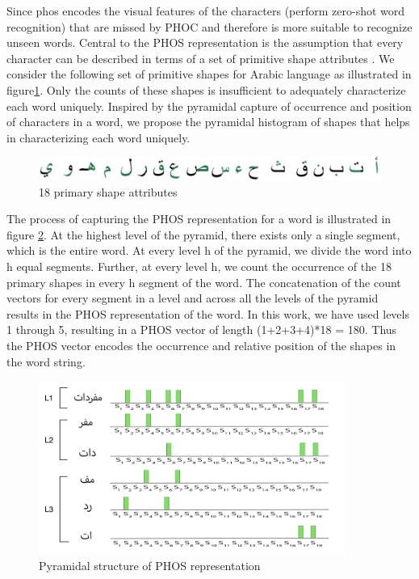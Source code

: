 Since \acrshort{phos} encodes the visual features of the characters (perform zero-shot word recognition) that are missed by PHOC and therefore is more suitable to recognize unseen words. Central to the PHOS representation is the assumption that every character can be described in terms of a set of primitive shape attributes \cite{ZEROSHOT}. We consider the following set of primitive shapes for Arabic language as illustrated in figure\ref{fig:arabic-primary-shape}. Only the counts of these shapes is insufficient to adequately characterize each word uniquely. Inspired by the pyramidal capture of occurrence and position of characters in a word, we propose the pyramidal histogram of shapes that helps in characterizing each word uniquely.

\begin{figure}[!htb]
    \centering
    \includegraphics[width=14cm]{images/arabic-letters.png}
    \caption{18 primary shape attributes}
    \label{fig:arabic-primary-shape}
\end{figure}


The process of capturing the PHOS representation for a word is illustrated in figure \ref{fig:phos-representation}. At the highest level of the pyramid, there exists only a single segment, which is the entire word. At every level h of the pyramid, we divide the word into h equal segments. Further, at every level h, we count the occurrence of the 18 primary shapes in every h segment of the word. The concatenation of the count vectors for every segment in a level and across all the levels of the pyramid results in the PHOS representation of the word. In this work, we have used levels 1 through 5, resulting in a PHOS vector of length (1+2+3+4)*18 = 180. Thus the PHOS vector encodes the occurrence and relative position of the shapes in the word string.

\begin{figure}[!htb]
    \centering
    \includegraphics[width=10cm]{images/phos_representation-arabic.png}
    \caption{Pyramidal structure of PHOS representation}
    \label{fig:phos-representation}
\end{figure}

